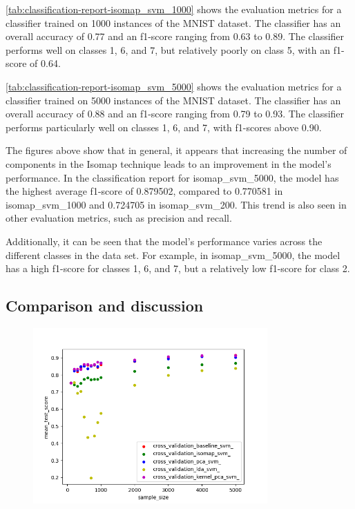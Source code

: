 \ref{tab:classification-report-isomap_svm_1000} shows the evaluation metrics for a classifier trained on 1000 instances of the MNIST dataset. The classifier has an overall accuracy of 0.77 and an f1-score ranging from 0.63 to 0.89. The classifier performs well on classes 1, 6, and 7, but relatively poorly on class 5, with an f1-score of 0.64.





\ref{tab:classification-report-isomap_svm_5000} shows the evaluation metrics for a classifier trained on 5000 instances of the MNIST dataset. The classifier has an overall accuracy of 0.88 and an f1-score ranging from 0.79 to 0.93. The classifier performs particularly well on classes 1, 6, and 7, with f1-scores above 0.90.


The figures above show that in general, it appears that increasing the number of components in the Isomap technique leads to an improvement in the model's performance. In the classification report for isomap\_svm\_5000, the model has the highest average f1-score of 0.879502, compared to 0.770581 in isomap\_svm\_1000 and 0.724705 in isomap\_svm\_200. This trend is also seen in other evaluation metrics, such as precision and recall.
    
Additionally, it can be  seen that the model's performance varies across the different classes in the data set. For example, in isomap\_svm\_5000, the model has a high f1-score for classes 1, 6, and 7, but a relatively low f1-score for class 2.


\subsection{Comparison and discussion}

\begin{figure}[htb!]
    \centering
    \includegraphics[width=0.8\textwidth]{figures/test_score_based_on_size.png}
    \caption{}
    \label{fig:experiment_4_performance_size}
\end{figure}


